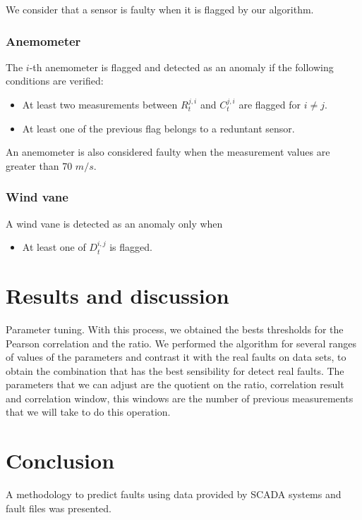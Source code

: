 \documentclass[journal]{IEEEtran}
\begin{document}
We consider that a sensor is faulty when it is flagged by our algorithm.
\subsubsection{Anemometer}
The $i$-th anemometer is flagged and detected as an anomaly if the following conditions are verified:
\begin{itemize}
	\item At least two measurements between $R_{t}^{j,i}$ and $C_{t}^{j,i}$ are flagged for $i \neq j$.
	\item At least one of the previous flag belongs to a reduntant sensor.
\end{itemize}
An anemometer is also considered faulty when the measurement values are greater than 70 $m/s$.

\subsubsection{Wind vane}
A wind vane is detected as an anomaly only when 
\begin{itemize}
	\item At least one of $D_t^{i,j}$ is flagged.
\end{itemize}

\section{Results and discussion}\label{sec:results}
Parameter tuning.
With this process, we obtained the bests thresholds for the Pearson correlation and the ratio. We performed the algorithm for several ranges of values of the parameters and contrast it with the real faults on data sets, to obtain the combination that has the best sensibility for detect real faults. The parameters that we can adjust are the quotient on the ratio, correlation result and correlation window, this windows are the number of previous measurements that we will take to do this operation.

\section{Conclusion}\label{sec:conclusion}
A methodology to predict faults using data provided by SCADA systems and fault files was presented. 






\end{document}
